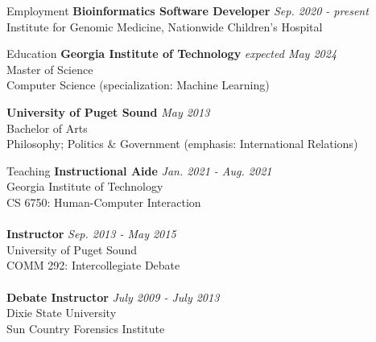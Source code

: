 \documentclass{cv} %
\begin{document}
\begin{rSection}{Employment}
{\bf Bioinformatics Software Developer} \hfill {\em Sep. 2020 - present}\\
Institute for Genomic Medicine, Nationwide Children's Hospital
\end{rSection}


\begin{rSection}{Education}
{\bf Georgia Institute of Technology} \hfill {\em expected May 2024}\\
Master of Science\\
Computer Science (specialization: Machine Learning)

{\bf University of Puget Sound} \hfill {\em May 2013}\\
Bachelor of Arts\\
Philosophy; Politics \& Government (emphasis: International Relations)
\end{rSection}


\begin{rSection}{Teaching}
{\bf Instructional Aide} \hfill {\em Jan. 2021 - Aug. 2021}\\
Georgia Institute of Technology\\
CS 6750: Human-Computer Interaction\\
\\
{\bf Instructor} \hfill {\em Sep. 2013 - May 2015}\\
University of Puget Sound\\
COMM 292: Intercollegiate Debate\\
\\
{\bf Debate Instructor} \hfill {\em July 2009 - July 2013}\\
Dixie State University\\
Sun Country Forensics Institute\\
\end{rSection}
\end{document}
